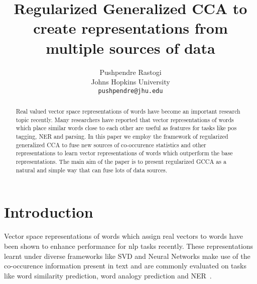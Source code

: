 \documentclass[11pt]{article}
\title{Regularized Generalized CCA to create
  representations from multiple sources of data}
\author{Pushpendre Rastogi \\
  Johns Hopkins University \\
  {\tt pushpendre@jhu.edu} 
}
\date{}
\begin{document}
\maketitle
\begin{abstract}
  Real valued vector space representations of words have become an
  important research topic recently. Many researchers have reported
  that vector representations of words which place similar words close
  to each other are useful as features for tasks like pos tagging, NER and 
  parsing. In this paper we employ the framework of regularized generalized CCA
  to fuse new sources of co-occurence statistics and other representations to learn vector
   representations of words which outperform the base
   representations. The main aim of the paper is to present
   regularized GCCA as a natural and simple way that can fuse lots of
   data sources.
\end{abstract}

\section{Introduction}
Vector space representations of words which assign
 real vectors to words have been shown to enhance performance for nlp
 tasks recently. These representations learnt under diverse frameworks like
 SVD and Neural Networks make use of the co-occurence information
 present in text and are commonly evaluated on tasks
 like word similarity prediction, word analogy prediction and
 NER~\cite{dhillon2011multi,dhillon2012two,mikolov2013efficient,mikolov2013distributed,collobert2013word,zou2013bilingual,faruqui2014improving,pennington2014glove,bansal2014tailoring,levy2014dependency,levy2014linguistic,dhillon2011multi,dhillon2012two}.
\end{document}
